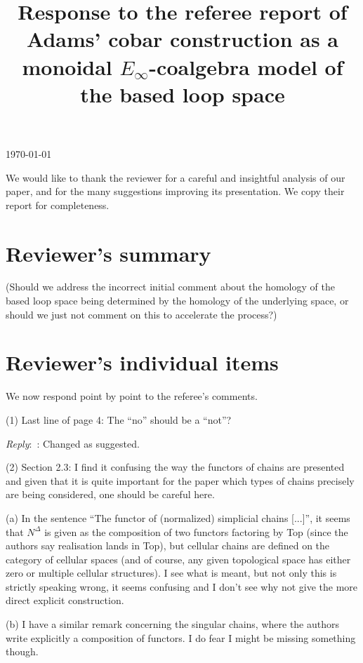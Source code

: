 \documentclass{amsart}
\title[Referee reply]{Response to the referee report of \\ Adams' cobar construction as a monoidal $E_{\infty}$-coalgebra model of the based loop space}
\newcommand{\ar}{\medskip\noindent\textit{Reply}:\ }
\newcommand{\rp}{\medskip\noindent}
\begin{document}
	\noindent\today
	\maketitle

	We would like to thank the reviewer for a careful and insightful analysis of our paper, and for the many suggestions improving its presentation.
	We copy their report for completeness.

	\section{Reviewer's summary}

	(Should we address the incorrect initial comment about the homology of the based loop space being determined by the homology of the underlying space, or should we just not comment on this to accelerate the process?)

	 

	\section{Reviewer's individual items}

	\noindent We now respond point by point to the referee's comments.

	\rp (1) Last line of page 4: The “no” should be a “not”?

	\ar: Changed as suggested.

	\rp (2) Section 2.3: I find it confusing the way the functors of chains are presented
	and given that it is quite important for the paper which types of chains
	precisely are being considered, one should be careful here.

	\rp (a) In the sentence “The functor of (normalized) simplicial chains [...]”, it seems that $N^\Delta$ is given as the composition of two functors factoring by Top (since the authors say realisation lands in Top), but cellular chains are defined on the category of cellular spaces (and of course, any
	given topological space has either zero or multiple cellular structures).
	I see what is meant, but not only this is strictly speaking wrong, it seems confusing and I don’t see why not give the more direct explicit construction.

	\rp (b) I have a similar remark concerning the singular chains, where the authors write explicitly a composition of functors.
	I do fear I might be missing something though.
\end{document}
